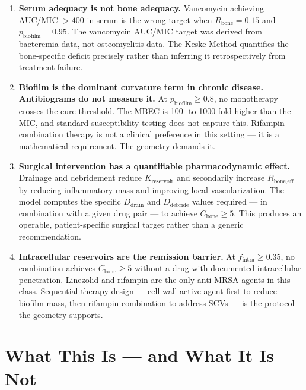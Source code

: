 \documentclass[11pt]{article}
\begin{document}
\begin{enumerate}[leftmargin=1.4em]
  \item \textbf{Serum adequacy is not bone adequacy.} Vancomycin achieving AUC/MIC
        $> 400$ in serum is the wrong target when $R_{\text{bone}} = 0.15$ and
        $p_{\text{biofilm}} = 0.95$. The vancomycin AUC/MIC target was derived
        from bacteremia data, not osteomyelitis data. The Keske Method quantifies
        the bone-specific deficit precisely rather than inferring it retrospectively
        from treatment failure.

  \item \textbf{Biofilm is the dominant curvature term in chronic disease. Antibiograms
        do not measure it.} At $p_{\text{biofilm}} \geq 0.8$, no monotherapy crosses
        the cure threshold. The MBEC is 100- to 1000-fold higher than the MIC, and
        standard susceptibility testing does not capture this. Rifampin combination
        therapy is not a clinical preference in this setting — it is a mathematical
        requirement. The geometry demands it.

  \item \textbf{Surgical intervention has a quantifiable pharmacodynamic effect.}
        Drainage and debridement reduce $K_{\text{reservoir}}$ and secondarily
        increase $R_{\text{bone,eff}}$ by reducing inflammatory mass and improving
        local vascularization. The model computes the specific $D_{\text{drain}}$
        and $D_{\text{debride}}$ values required — in combination with a given drug
        pair — to achieve $C_{\text{bone}} \geq 5$. This produces an operable,
        patient-specific surgical target rather than a generic recommendation.

  \item \textbf{Intracellular reservoirs are the remission barrier.} At
        $f_{\text{intra}} \geq 0.35$, no combination achieves $C_{\text{bone}} \geq 5$
        without a drug with documented intracellular penetration. Linezolid and
        rifampin are the only anti-MRSA agents in this class. Sequential therapy
        design — cell-wall-active agent first to reduce biofilm mass, then
        rifampin combination to address SCVs — is the protocol the geometry
        supports.
\end{enumerate}

\section{What This Is — and What It Is Not}
\end{document}
